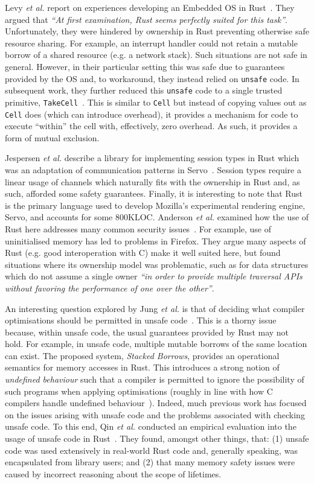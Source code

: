 Levy {\em et al.} report on experiences developing an Embedded OS in
Rust~\cite{LACCDGLP15}.  They argued that {\em ``At first examination,
  Rust seems perfectly suited for this task''}.  Unfortunately, they
were hindered by ownership in Rust preventing otherwise safe resource
sharing.  For example, an interrupt handler could not retain a mutable
borrow of a shared resource (e.g. a network stack).  Such situations
are not safe in general.  However, in their particular setting this
was safe due to guarantees provided by the OS and, to workaround, they
instead relied on \lstinline{unsafe} code.  In subsequent work, they
further reduced this \lstinline{unsafe} code to a single trusted
primitive, \lstinline{TakeCell}~\cite{LCGPDL17,LCGGPPL17}.  This is
similar to \lstinline{Cell} but instead of copying values out as
\lstinline{Cell} does (which can introduce overhead), it provides a
mechanism for code to execute ``within'' the cell with, effectively,
zero overhead.  As such, it provides a form of mutual exclusion.

Jespersen {\em et al.}  describe a library for implementing session
types in Rust which was an adaptation of communication patterns in
Servo~\cite{JML15}.  Session types require a linear usage of channels
which naturally fits with the ownership in Rust and, as such, afforded
some safety guarantees.  Finally, it is interesting to note that Rust
is the primary language used to develop Mozilla's experimental
rendering engine, Servo, and accounts for some 800KLOC.  Anderson {\em
  et al.} examined how the use of Rust here addresses many common
security issues~\cite{ABGMMMS16}.  For example, use of uninitialised
memory has led to problems in Firefox.  They argue many aspects of
Rust (e.g. good interoperation with C) make it well suited here, but
found situations where its ownership model was problematic, such as
for data structures which do not assume a single owner {\em ``in order
  to provide multiple traversal APIs without favoring the performance
  of one over the other''}.

An interesting question explored by Jung {\em et al.} is that of
deciding what compiler optimisations should be permitted in unsafe
code~\cite{JDKJD20}.  This is a thorny issue because, within unsafe
code, the usual guarantees provided by Rust may not hold.  For
example, in unsafe code, multiple mutable borrows of the same location
can exist.  The proposed system, {\em Stacked Borrows}, provides an
operational semantics for memory accesses in Rust.  This introduces a
strong notion of {\em undefined behaviour} such that a compiler is
permitted to ignore the possibility of such programs when applying
optimisations (roughly in line with how C compilers handle undefined
behaviour~\cite{MGDKRWS19}).  Indeed, much previous work has focused
on the issues arising with unsafe code and the problems associated
with checking unsafe code.  To this end, Qin {\em et al.}  conducted
an empirical evaluation into the usage of unsafe code in
Rust~\cite{QCYSZ20}. They found, amongst other things, that: (1)
unsafe code was used extensively in real-world Rust code and,
generally speaking, was encapsulated from library users; and (2) that
many memory safety issues were caused by incorrect reasoning about the
scope of lifetimes.

